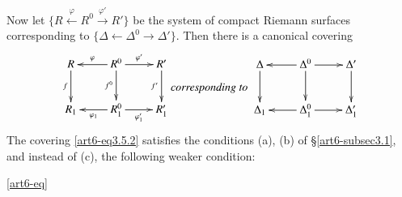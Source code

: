 Now let $\{R \xleftarrow{\varphi} R^0 \xrightarrow{\varphi'} R'\}$ be the system of compact Riemann surfaces corresponding to $\{\Delta \leftarrow \Delta^0 \rightarrow \Delta'\}$. Then there is a canonical covering 
\setcounter{equation}{1}
\begin{equation}
\vcenter{
\xymatrix{
R \ar[d]_-f & R^0\ar[r]^-{\varphi'}\ar[d]_-{f^0}\ar[l]_-{\varphi} & R' \ar[d]_-{f'}\\
R_1 & R^0_1 \ar[r]_-{\varphi'_1} \ar[l]^-{\varphi_1} & R'_1
}}
\textit{corresponding to }
\vcenter{
\xymatrix{
\Delta \ar[d] & \Delta^0\ar[r] \ar[d] \ar[l]& \Delta' \ar[d]\\
\Delta_1 & \Delta^0_1 \ar[r] \ar[l]& \Delta'_1
}}\label{art6-eq3.5.2}
\end{equation}
The covering \eqref{art6-eq3.5.2} satisfies the conditions (a), (b) of \S \ref{art6-subsec3.1}, and instead of (c), the following weaker condition:


\eqref{art6-eq}



